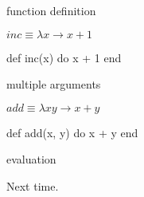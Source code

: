 \begin{frame}{function definition}

  $inc \equiv \lambda x \rightarrow x + 1$
  \pause

  \begin{code}
    def inc(x) do
       x + 1
    end 
  \end{code}

\end{frame}

\begin{frame}{multiple arguments}

  $add \equiv \lambda x y \rightarrow x + y$
  \pause

  \begin{code}
    def add(x, y) do
       x + y
    end
  \end{code}

\end{frame}


\begin{frame}{evaluation}

\pause
\vspace{100pt}\hspace{100pt}Next time.

\end{frame}



